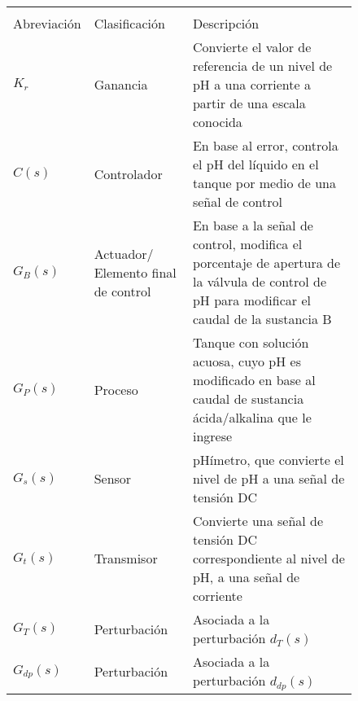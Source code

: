 \begin{figure}[!h]
    \centering
    \setlength\extrarowheight{3mm}
    \begin{tabular}{>{\centering\arraybackslash}p{3cm}p{3cm}p{10cm}}
        \toprule\\[-2.5em]
        Abreviación & Clasificación & Descripción\\
        \midrule
        $K_r$ & Ganancia & Convierte el valor de referencia de un nivel de pH a una corriente a partir de una escala conocida\\
        $C(s)$ & Controlador & En base al error, controla el pH del líquido en el tanque por medio de una señal de control\\
        $G_B(s)$ & Actuador/ \newline Elemento final de control & En base a la señal de control, modifica el porcentaje de apertura de la válvula de control de pH para modificar el caudal de la sustancia B\\
        $G_P(s)$ & Proceso & Tanque con solución acuosa, cuyo pH es modificado en base al caudal de sustancia ácida/alkalina que le ingrese\\
        $G_s(s)$ & Sensor & pHímetro, que convierte el nivel de pH a una señal de tensión DC\\
        $G_t(s)$ & Transmisor & Convierte una señal de tensión DC correspondiente al nivel de pH, a una señal de corriente\\
        $G_T(s)$ & Perturbación & Asociada a la perturbación $d_T(s)$\\
        $G_{dp}(s)$ & Perturbación & Asociada a la perturbación $d_{dp}(s)$\\
        \bottomrule
    \end{tabular}
    \label{t1}
\end{figure}

